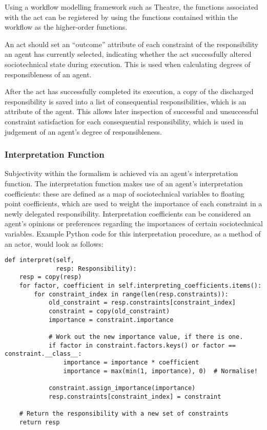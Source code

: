 Using a workflow modelling framework such as Theatre\cite{theatre_code}, the functions associated with the act can be registered by using the functions contained within the workflow as the higher-order functions.\par

An act should set an ``outcome'' attribute of each constraint of the responsibility an agent has currently selected, indicating whether the act successfully altered sociotechnical state during execution. This is used when calculating degrees of responsibleness of an agent.\par

After the act has successfully completed its execution, a copy of the discharged responsibility is saved into a list of consequential responsibilities, which is an attribute of the agent. This allows later inspection of successful and unsuccessful constraint satisfaction for each consequential responsibility, which is used in judgement of an agent's degree of responsibleness.\par

\subsubsection{Interpretation Function}\label{subsec:interpretation_function}
Subjectivity within the formalism is achieved via an agent's interpretation function. The interpretation function makes use of an agent's interpretation coefficients: these are defined as a map of sociotechnical variables to floating point coefficients, which are used to weight the importance of each constraint in a newly delegated responsibility. Interpretation coefficients can be considered an agent's opinions or preferences regarding the importances of certain sociotechnical variables. Example Python code for this interpretation procedure, as a method of an actor, would look as follows:

\begin{lstlisting}
def interpret(self,
              resp: Responsibility):
    resp = copy(resp)
    for factor, coefficient in self.interpreting_coefficients.items():
        for constraint_index in range(len(resp.constraints)):
            old_constraint = resp.constraints[constraint_index]
            constraint = copy(old_constraint)
            importance = constraint.importance

            # Work out the new importance value, if there is one.
            if factor in constraint.factors.keys() or factor == constraint.__class__:
                importance = importance * coefficient
                importance = max(min(1, importance), 0)  # Normalise!

            constraint.assign_importance(importance)
            resp.constraints[constraint_index] = constraint

    # Return the responsibility with a new set of constraints
    return resp
\end{lstlisting}


